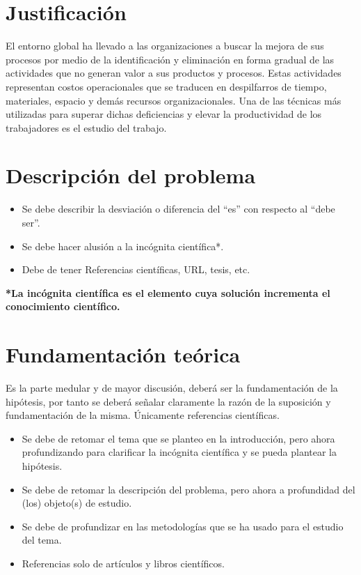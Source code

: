         \section{Justificación}
        
        El entorno global ha llevado a las organizaciones a buscar la mejora de sus procesos por medio de la identificación y eliminación en forma gradual de las actividades que no generan valor a sus productos y procesos. Estas actividades representan costos operacionales que se traducen en despilfarros de tiempo, materiales, espacio y demás recursos organizacionales. Una de las técnicas más utilizadas para superar dichas deficiencias y elevar la productividad de los trabajadores es el estudio del trabajo.
            
        
        \section{Descripción del problema}
        \begin{itemize}
            \item Se debe describir la desviación o diferencia del ``es'' con respecto al ``debe ser''.
            \item Se debe hacer alusión a la incógnita científica*.
            \item Debe de tener Referencias científicas, URL, tesis, etc.
        \end{itemize}
        
        \textbf{*La incógnita científica es el elemento cuya solución incrementa el conocimiento científico.}
        \section{Fundamentación teórica}
        
        Es la parte medular y de mayor discusión, deberá ser la fundamentación de la hipótesis, por tanto se deberá señalar claramente la razón de la suposición y fundamentación de la misma. Únicamente referencias científicas.
        \begin{itemize}
            \item Se debe de retomar el tema que se planteo en la introducción, pero ahora profundizando para clarificar la incógnita científica y se pueda plantear la hipótesis.
            \item Se debe de retomar la descripción del problema, pero ahora a profundidad del (los) objeto(s) de estudio. 
            \item Se debe de profundizar en las metodologías que se ha usado para el estudio del tema.
            \item Referencias solo de artículos y libros científicos.
        \end{itemize}
